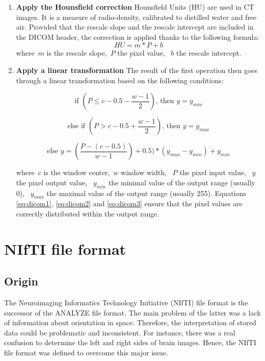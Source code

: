 \begin{enumerate}
	\item \textbf{Apply the Hounsfield correction}\newline
	Hounsfield Units (HU) are used in CT images. It is a measure of radio-density, calibrated to distilled water and free air. Provided that the rescale slope and the rescale intercept are included in the DICOM header, the correction is applied thanks to the following formula:
\begin{equation}
	HU = m * P + b
\end{equation}
	where~$m$ is the rescale slope,~$P$ the pixel value, ~$b$ the rescale intercept.

	\item \textbf{Apply a linear transformation}\newline
	The result of the first operation then goes through a linear transformation based on the following conditions: 

\begin{equation}\label{eq:dicom1}
\textrm{if } (P \leq c - 0.5 - \frac{w-1}{2}) \textrm{, then }y = y_{min}
\end{equation}

\begin{equation}\label{eq:dicom2}
\textrm{else if } (P > c - 0.5 + \frac{w-1}{2}) \textrm{, then }y = y_{max}
\end{equation}

\begin{equation}\label{eq:dicom3}
\textrm{else } y = (\frac{P - (c - 0.5)}{w-1}) + 0.5) * (y_{max} - y_{min}) + y_{min}
\end{equation}

where~$c$ is the window center,~$w$ window width, ~$P$ the pixel input value, ~$y$ the pixel output value, ~$y_{min}$ the minimal value of the output range (usually 0), ~$y_{max}$ the maximal value of the output range (usually 255). Equations \ref{eq:dicom1}, \ref{eq:dicom2} and \ref{eq:dicom3} ensure that the pixel values are correctly distributed within the output range. 
\end{enumerate}


\section{NIfTI file format}
\subsection{Origin}
\setlength{\marginparwidth}{3cm}\leavevmode {}The Neuroimaging Informatics Technology Initiative (NIfTI) file format is the successor of the ANALYZE file format. The main problem of the latter was a lack of information about orientation in space. Therefore, the interpretation of stored data could be problematic and inconsistent. For instance, there was a real confusion to determine the left and right sides of brain images. Hence, the NIfTI file format was defined to overcome this major issue.


